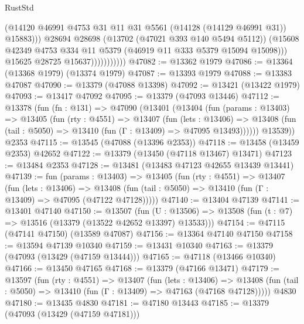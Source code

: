 \begin{lexlean}{RustStd}
\begin{coremodule}
                                (@14120
                                  @46991
                                  @4753
                                  @31
                                  @11
                                  @31
                                  @5561
                                  (@14128 (@14129 @46991 @31))
                                  @15883)))
                            @28694
                            @28698
                            (@13702 (@47021 @393 @140 @5494 @5112))
                            (@15608
                              @42349
                              @4753
                              @334
                              @11
                              @5379
                              (@46919 @11 @333 @5379 @15094 @15098)))
                          @15625
                          @28725
                          @15637)))))))))))
@47082 := @13362 @1979
@47086 := @13364 (@13368 @1979) (@13374 @1979)
@47087 := @13393 @1979
@47088 := @13383 @47087
@47090 := @13379 (@47088 @13398)
@47092 := @13421 (@13422 @1979)
@47093 := @13417 @47092
@47095 := @13379 (@47093 @13446)
@47112 := @13378
    (fun (fn : @131) =>
    @47090
      (@13401
        (@13404
          (fun (params : @13403) =>
          @13405
            (fun (rty : @4551) =>
            @13407
              (fun (lets : @13406) =>
              @13408 (fun (tail : @5050) => @13410 (fun (Γ : @13409) => @47095 @13493))))))
        @13539))
    @2353
@47115 := @13545 (@47088 (@13396 @2353))
@47118 := @13458 (@13459 @2353) @42652
@47122 := @13379 (@13450 (@47118 @13467) @13471)
@47123 := @13484 @2353
@47128 := @13481 (@13483 @47123 @42655 @13439 @13441)
@47139 := fun (params : @13403) =>
  @13405
    (fun (rty : @4551) =>
    @13407
      (fun (lets : @13406) =>
      @13408 (fun (tail : @5050) => @13410 (fun (Γ : @13409) => @47095 (@47122 @47128)))))
@47140 := @13404 @47139
@47141 := @13401 @47140
@47150 := @13507
    (fun (U : @13506) => @13508 (fun (t : @7) => @13516 (@13379 (@13522 @42652 @13397) @13533)))
@47154 := @47115 (@47141 @47150) (@13589 @47087)
@47156 := @13364 @47140 @47150
@47158 := @13594 @47139 @10340
@47159 := @13431 @10340
@47163 := @13379 (@47093 (@13429 (@47159 @13444)))
@47165 := @47118 (@13466 @10340)
@47166 := @13450 @47165
@47168 := @13379 (@47166 @13471)
@47179 := @13597
    (fun (rty : @4551) =>
    @13407
      (fun (lets : @13406) =>
      @13408 (fun (tail : @5050) => @13410 (fun (Γ : @13409) => @47163 (@47168 @47128)))))
    @4830
@47180 := @13435 @4830
@47181 := @47180 @13443
@47185 := @13379 (@47093 (@13429 (@47159 @47181)))

\end{coremodule}
\end{lexlean}
